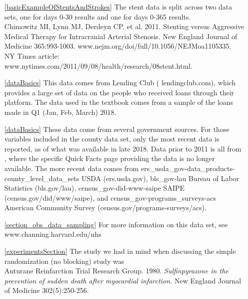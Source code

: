 \begin{itemize}
\setlength{\itemsep}{0mm}
\item[\ref{basicExampleOfStentsAndStrokes}]
    The stent data is split across two data sets,
    one for days 0-30 results and one for days 0-365
    results. \\
    Chimowitz MI, Lynn MJ, Derdeyn CP, et al. 2011.
    Stenting versus Aggressive Medical Therapy for
    Intracranial Arterial Stenosis.
    New England Journal of Medicine 365:993-1003.
        {www.nejm.org/doi/full/10.1056/NEJMoa1105335}. \\
    NY Times article:
        {www.nytimes.com/2011/09/08/health/research/08stent.html}.

\item[\ref{dataBasics}]
    This data comes from Lending Club
    (
        {lendingclub.com}),
    which provides a large set of data on the people who
    received loans through their platform.
    The data used in the textbook comes from a sample
    of the loans made in Q1 (Jan, Feb, March) 2018.
\item[\ref{dataBasics}]
    These data come from several government sources.
    For those variables included in the
    county data set, only the most recent data is reported,
    as of what was available in late 2018.
    Data prior to 2011 is all from
    ,
    where the specific Quick Facts page providing the data
    is no longer available.
    The more recent data comes from
    \oiRedirect
        {ers_usda_gov-data_products-county_level_data_sets}
        {USDA (ers.usda.gov)},
    \oiRedirect
        {bls_gov-lau}
        {Bureau of Labor Statistics (bls.gov/lau)},
    \oiRedirect
        {census_gov-did-www-saipe}
        {SAIPE (census.gov/did/www/saipe)},
    and
    \oiRedirect
        {census_gov-programs_surveys-acs}
        {American Community Survey
            (census.gov/programs-surveys/acs)}.

\item[\ref{section_obs_data_sampling}]
    For more information on this data set, see \\
        {www.channing.harvard.edu/nhs}

\item[\ref{experimentsSection}]
    The study we had in mind when discussing the
    simple randomization (no blocking) study was \\
    Anturane Reinfarction Trial Research Group. 1980.
    \emph{Sulfinpyrazone in the prevention of sudden
    death after myocardial infarction.}
    New England Journal of Medicine 302(5):250-256.
\end{itemize}







